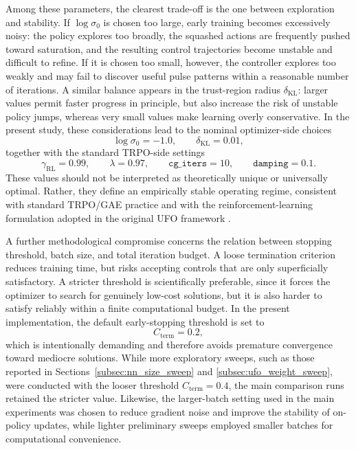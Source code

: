 Among these parameters, the clearest trade-off is the one between exploration and stability. If \(\log \sigma_{0}\) is chosen too large, early training becomes excessively noisy: the policy explores too broadly, the squashed actions are frequently pushed toward saturation, and the resulting control trajectories become unstable and difficult to refine. If it is chosen too small, however, the controller explores too weakly and may fail to discover useful pulse patterns within a reasonable number of iterations. A similar balance appears in the trust-region radius \(\delta_{\mathrm{KL}}\): larger values permit faster progress in principle, but also increase the risk of unstable policy jumps, whereas very small values make learning overly conservative. In the present study, these considerations lead to the nominal optimizer-side choices
\begin{equation}
\log \sigma_0 = -1.0,
\qquad
\delta_{\mathrm{KL}} = 0.01,
\label{eq:default_training_exploration_trustregion}
\end{equation}
together with the standard TRPO-side settings
\begin{equation}
\gamma_{\mathrm{RL}}=0.99,
\qquad
\lambda=0.97,
\qquad
\texttt{cg\_iters}=10,
\qquad
\texttt{damping}=0.1.
\label{eq:default_training_auxiliary_parameters}
\end{equation}
These values should not be interpreted as theoretically unique or universally optimal. Rather, they define an empirically stable operating regime, consistent with standard TRPO/GAE practice and with the reinforcement-learning formulation adopted in the original UFO framework \cite{Schulman2015,Schulman2016GAE,Niu2019}.

A further methodological compromise concerns the relation between stopping threshold, batch size, and total iteration budget. A loose termination criterion reduces training time, but risks accepting controls that are only superficially satisfactory. A stricter threshold is scientifically preferable, since it forces the optimizer to search for genuinely low-cost solutions, but it is also harder to satisfy reliably within a finite computational budget. In the present implementation, the default early-stopping threshold is set to
\begin{equation}
C_{\mathrm{term}}=0.2,
\label{eq:default_training_termination_cost}
\end{equation}
which is intentionally demanding and therefore avoids premature convergence toward mediocre solutions. While more exploratory sweeps, such as those reported in Sections~\ref{subsec:nn_size_sweep} and \ref{subsec:ufo_weight_sweep}, were conducted with the looser threshold \(C_{\mathrm{term}}=0.4\), the main comparison runs retained the stricter value. Likewise, the larger-batch setting used in the main experiments was chosen to reduce gradient noise and improve the stability of on-policy updates, while lighter preliminary sweeps employed smaller batches for computational convenience.

